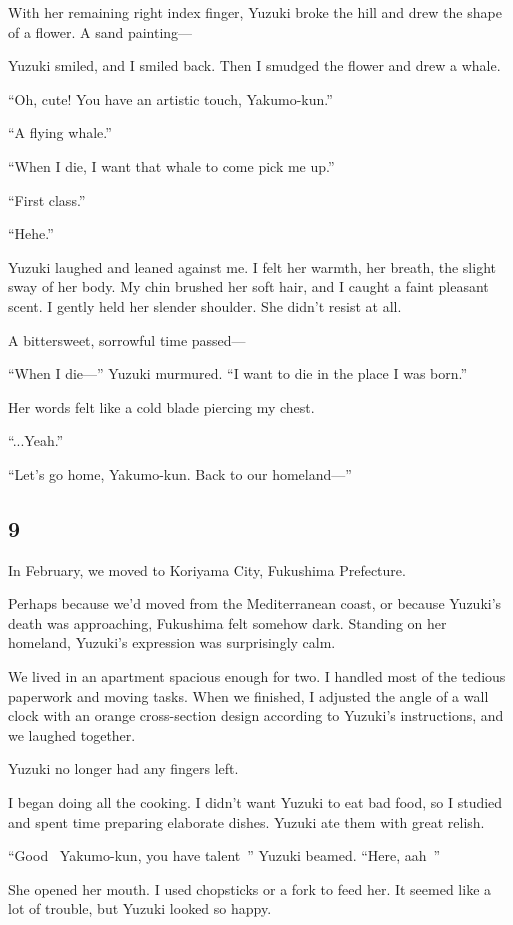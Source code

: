 \documentclass[
    a4paper,
    12pt,
    twoside,
    openany,
    UTF8,
    fontset=windows
]{ctexbook}
\begin{document}
With her remaining right index finger, Yuzuki broke the hill and drew the shape of a flower. A sand painting---

Yuzuki smiled, and I smiled back. Then I smudged the flower and drew a whale.

``Oh, cute! You have an artistic touch, Yakumo-kun.''

``A flying whale.''

``When I die, I want that whale to come pick me up.''

``First class.''

``Hehe.''

Yuzuki laughed and leaned against me. I felt her warmth, her breath, the slight sway of her body. My chin brushed her soft hair, and I caught a faint pleasant scent. I gently held her slender shoulder. She didn't resist at all.

A bittersweet, sorrowful time passed---

``When I die---'' Yuzuki murmured. ``I want to die in the place I was born.''

Her words felt like a cold blade piercing my chest.

``...Yeah.''

``Let's go home, Yakumo-kun. Back to our homeland---''


\subsection*{9}

In February, we moved to Koriyama City, Fukushima Prefecture.

Perhaps because we'd moved from the Mediterranean coast, or because Yuzuki's death was approaching, Fukushima felt somehow dark. Standing on her homeland, Yuzuki's expression was surprisingly calm.

We lived in an apartment spacious enough for two. I handled most of the tedious paperwork and moving tasks. When we finished, I adjusted the angle of a wall clock with an orange cross-section design according to Yuzuki's instructions, and we laughed together.

Yuzuki no longer had any fingers left.

I began doing all the cooking. I didn't want Yuzuki to eat bad food, so I studied and spent time preparing elaborate dishes. Yuzuki ate them with great relish.

``Good~ Yakumo-kun, you have talent~'' Yuzuki beamed. ``Here, aah~''

She opened her mouth. I used chopsticks or a fork to feed her. It seemed like a lot of trouble, but Yuzuki looked so happy.
\end{document}
